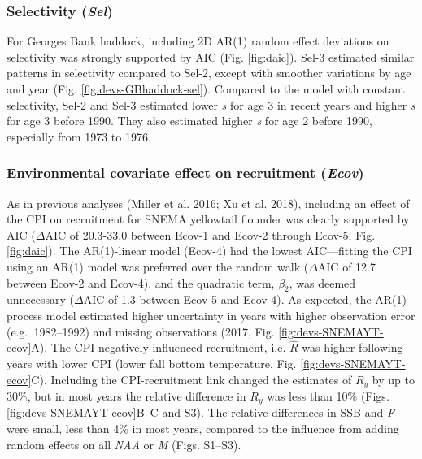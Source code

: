 \documentclass[]{article}
\begin{document}
\hypertarget{selectivity-sel-1}{%
\subsubsection{\texorpdfstring{Selectivity
(\emph{Sel})}{Selectivity (Sel)}}\label{selectivity-sel-1}}

For Georges Bank haddock, including 2D AR(1) random effect deviations on
selectivity was strongly supported by AIC (Fig. \ref{fig:daic}). Sel-3
estimated similar patterns in selectivity compared to Sel-2, except with
smoother variations by age and year (Fig. \ref{fig:devs-GBhaddock-sel}).
Compared to the model with constant selectivity, Sel-2 and Sel-3
estimated lower \emph{s} for age 3 in recent years and higher \emph{s}
for age 3 before 1990. They also estimated higher \emph{s} for age 2
before 1990, especially from 1973 to 1976.

\hypertarget{environmental-covariate-effect-on-recruitment-ecov}{%
\subsubsection{\texorpdfstring{Environmental covariate effect on
recruitment
(\emph{Ecov})}{Environmental covariate effect on recruitment (Ecov)}}\label{environmental-covariate-effect-on-recruitment-ecov}}

As in previous analyses (Miller et al. 2016; Xu et al. 2018), including
an effect of the CPI on recruitment for SNEMA yellowtail flounder was
clearly supported by AIC (\(\Delta \text{AIC}\) of 20.3-33.0 between
Ecov-1 and Ecov-2 through Ecov-5, Fig. \ref{fig:daic}). The AR(1)-linear
model (Ecov-4) had the lowest AIC---fitting the CPI using an AR(1) model
was preferred over the random walk (\(\Delta \text{AIC}\) of 12.7
between Ecov-2 and Ecov-4), and the quadratic term, \(\beta_2\), was
deemed unnecessary (\(\Delta \text{AIC}\) of 1.3 between Ecov-5 and
Ecov-4). As expected, the AR(1) process model estimated higher
uncertainty in years with higher observation error (e.g.~1982--1992) and
missing observations (2017, Fig. \ref{fig:devs-SNEMAYT-ecov}A). The CPI
negatively influenced recruitment, i.e. \(\hat{R}\) was higher following
years with lower CPI (lower fall bottom temperature, Fig.
\ref{fig:devs-SNEMAYT-ecov}C). Including the CPI-recruitment link
changed the estimates of \(R_y\) by up to 30\%, but in most years the
relative difference in \(R_y\) was less than 10\% (Figs.
\ref{fig:devs-SNEMAYT-ecov}B--C and S3). The relative differences in SSB
and \emph{F} were small, less than 4\% in most years, compared to the
influence from adding random effects on all \emph{NAA} or \emph{M}
(Figs. S1--S3).
\end{document}
